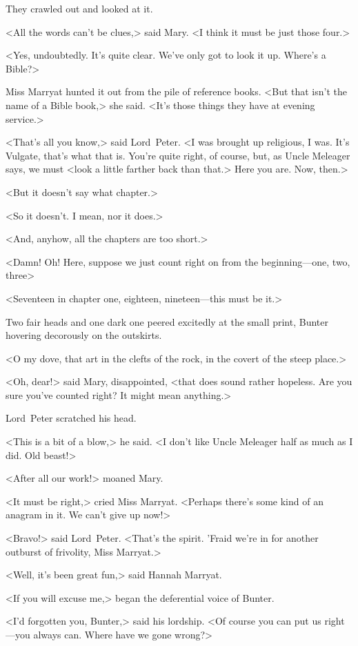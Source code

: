 They crawled out and looked at it.

<All the words can't be clues,> said Mary. <I think it must be just those four.>

<Yes, undoubtedly. It's quite clear. We've only got to look it up. Where's a Bible?>

Miss Marryat hunted it out from the pile of reference books. <But that isn't the name of a Bible book,> she said. <It's those things they have at evening service.>

<That's all you know,> said Lord~Peter. <I was brought up religious, I was. It's Vulgate, that's what that is. You're quite right, of course, but, as Uncle Meleager says, we must <look a little farther back than that.> Here you are. Now, then.>

<But it doesn't say what chapter.>

<So it doesn't. I mean, nor it does.>

<And, anyhow, all the chapters are too short.>

<Damn! Oh! Here, suppose we just count right on from the beginning—one, two, three\longdash>

<Seventeen in chapter one, eighteen, nineteen—this must be it.>

Two fair heads and one dark one peered excitedly at the small print, Bunter hovering decorously on the outskirts.

<O my dove, that art in the clefts of the rock, in the covert of the steep place.>

<Oh, dear!> said Mary, disappointed, <that does sound rather hopeless. Are you sure you've counted right? It might mean anything.>

Lord~Peter scratched his head.

<This is a bit of a blow,> he said. <I don't like Uncle Meleager half as much as I did. Old beast!>

<After all our work!> moaned Mary.

<It must be right,> cried Miss Marryat. <Perhaps there's some kind of an anagram in it. We can't give up now!>

<Bravo!> said Lord~Peter. <That's the spirit. 'Fraid we're in for another outburst of frivolity, Miss Marryat.>

<Well, it's been great fun,> said Hannah Marryat.

<If you will excuse me,> began the deferential voice of Bunter.

<I'd forgotten you, Bunter,> said his lordship. <Of course you can put us right—you always can. Where have we gone wrong?>

